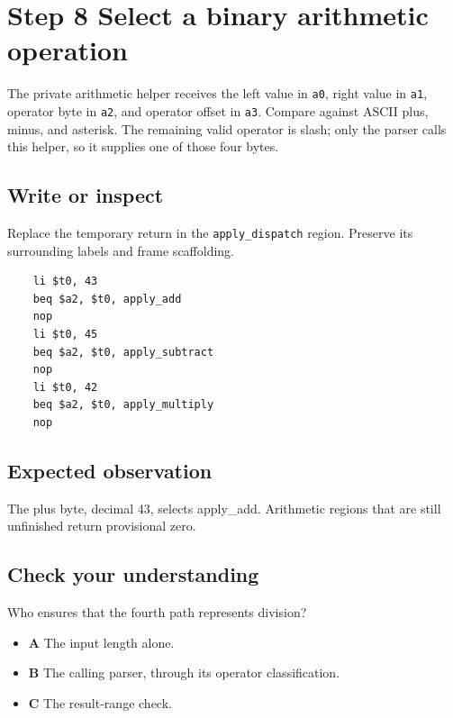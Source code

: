\section{Step 8 Select a binary arithmetic operation}\label{expression-s08}

The private arithmetic helper receives the left value in \texttt{a0}, right value in \texttt{a1}, operator byte in \texttt{a2}, and operator offset in \texttt{a3}. Compare against ASCII plus, minus, and asterisk. The remaining valid operator is slash; only the parser calls this helper, so it supplies one of those four bytes.

\subsection{Write or inspect}
Replace the temporary return in the \texttt{apply\_dispatch} region. Preserve its surrounding labels and frame scaffolding.

\begin{verbatim}
    li $t0, 43
    beq $a2, $t0, apply_add
    nop
    li $t0, 45
    beq $a2, $t0, apply_subtract
    nop
    li $t0, 42
    beq $a2, $t0, apply_multiply
    nop
\end{verbatim}
\subsection{Expected observation}
The plus byte, decimal 43, selects apply\_add. Arithmetic regions that are still unfinished return provisional zero.

\subsection{Check your understanding}
Who ensures that the fourth path represents division?

\begin{itemize}
  \item \textbf{A} The input length alone.
  \item \textbf{B} The calling parser, through its operator classification.
  \item \textbf{C} The result-range check.
\end{itemize}
